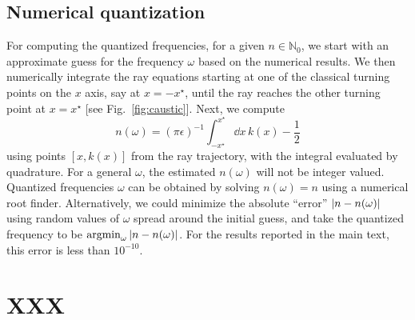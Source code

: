 \subsection{Numerical quantization}
\label{app:quantized}

For computing the quantized frequencies, for a given $n \in \mathbb{N}_{0}$, we start with an approximate guess for the frequency $\omega$ based on the numerical results.
We then numerically integrate the ray equations starting at one of the classical turning points on the $x$ axis, say at $x = -x^{\star}$, until the ray reaches the other turning point at $x = x^{\star}$ [see Fig.~\ref{fig:caustic}].
Next, we compute
%
\begin{equation}
  n(\omega) = (\pi\epsilon)^{-1} \int_{-x^{\star}}^{x^{\star}} \dd{x}\,k(x) - \frac{1}{2}
\end{equation}
%
using points $\left[x, k(x)\right]$ from the ray trajectory, with the integral evaluated by quadrature.
For a general $\omega$, the estimated $n(\omega)$ will not be integer valued.
Quantized frequencies $\omega$ can be obtained by solving $n(\omega) = n$ using a numerical root finder.
Alternatively, we could minimize the absolute ``error'' $\lvert n - n(\omega)\rvert$ using random values of $\omega$ spread around the initial guess, and take the quantized frequency to be $\operatorname*{argmin}_{\omega}\,\lvert n - n(\omega)\rvert$.
For the results reported in the main text, this error is less than $10^{-10}$.

\section{XXX}

